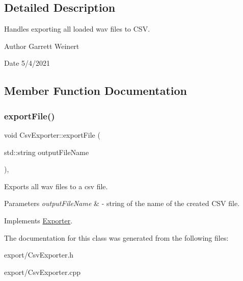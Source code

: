\subsection{Detailed Description}
Handles exporting all loaded wav files to C\+SV. \begin{DoxyAuthor}{Author}
Garrett Weinert 
\end{DoxyAuthor}
\begin{DoxyDate}{Date}
5/4/2021 
\end{DoxyDate}


\subsection{Member Function Documentation}
\mbox{\label{classCsvExporter_ac358fc74b1c01dbb3285fcdb38eb899e}} 
\subsubsection{\texorpdfstring{export\+File()}{exportFile()}}
{\footnotesize\ttfamily void Csv\+Exporter\+::export\+File (\begin{DoxyParamCaption}\item[{std\+::string}]{output\+File\+Name }\end{DoxyParamCaption})\hspace{0.3cm}{\ttfamily [override]}, {\ttfamily [virtual]}}

Exports all wav files to a csv file. 
\begin{DoxyParams}{Parameters}
{\em output\+File\+Name} & -\/ string of the name of the created C\+SV file. \\
\hline
\end{DoxyParams}


Implements \hyperlink{classExporter}{Exporter}.



The documentation for this class was generated from the following files\+:\begin{DoxyCompactItemize}
\item 
export/Csv\+Exporter.\+h\item 
export/Csv\+Exporter.\+cpp\end{DoxyCompactItemize}
